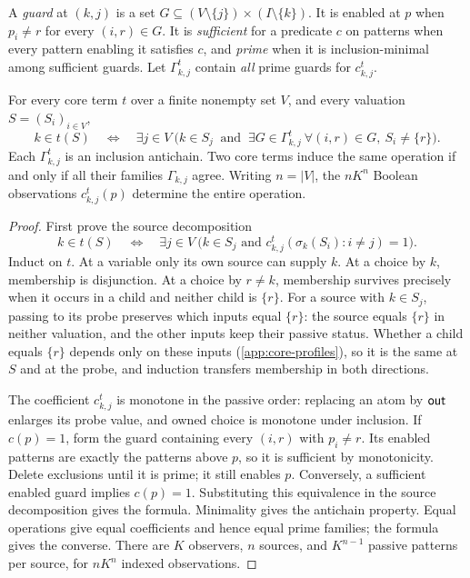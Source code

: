 A \emph{guard} at $(k,j)$ is a set
$G\subseteq(V\setminus\{j\})\times(I\setminus\{k\})$.
It is enabled at $p$ when $p_i\ne r$ for every $(i,r)\in G$.
It is \emph{sufficient} for a predicate $c$ on patterns when every
pattern enabling it satisfies $c$, and \emph{prime} when it is
inclusion-minimal among sufficient guards.
Let $\Gamma^t_{k,j}$ contain \emph{all} prime guards for $c^t_{k,j}$.

\begin{theorem}\label{core:thm:source-guards}
For every core term $t$ over a finite nonempty set $V$, and every valuation
$S=(S_i)_{i\in V}$,
\[
 k\in t(S)\quad\Longleftrightarrow\quad
 \exists j\in V\ \bigl(k\in S_j\ \text{ and }\
 \exists G\in\Gamma^t_{k,j}\ \forall(i,r)\in G,\ S_i\ne\{r\}\bigr).
\]
Each $\Gamma^t_{k,j}$ is an inclusion antichain. Two core terms induce
the same operation if and only if all their families $\Gamma_{k,j}$
agree. Writing $n=|V|$, the $nK^n$ Boolean observations
$c^t_{k,j}(p)$ determine the entire operation.
\end{theorem}
\begin{proof}
First prove the source decomposition
\[
 k\in t(S)\quad\Longleftrightarrow\quad
 \exists j\in V\ \bigl(k\in S_j\text{ and }
 c^t_{k,j}(\sigma_k(S_i):i\ne j)=1\bigr).
\]
Induct on $t$. At a variable only its own source can supply $k$. At a
choice by $k$, membership is disjunction. At a choice by $r\ne k$,
membership survives precisely when it occurs in a child and neither
child is $\{r\}$. For a source with $k\in S_j$, passing to its probe
preserves which inputs equal $\{r\}$: the source equals $\{r\}$ in
neither valuation, and the other inputs keep their passive status.
Whether a child equals $\{r\}$ depends only on these inputs
(\cref{app:core-profiles}), so it is the same at $S$ and at the probe,
and induction transfers membership in both directions.

The coefficient $c^t_{k,j}$ is monotone in the passive order: replacing
an atom by $\mathsf{out}$ enlarges its probe value, and owned choice is monotone
under inclusion. If $c(p)=1$, form the guard containing every $(i,r)$
with $p_i\ne r$. Its enabled patterns are exactly the patterns above
$p$, so it is sufficient by monotonicity. Delete exclusions until it is
prime; it still enables $p$. Conversely, a sufficient enabled guard
implies $c(p)=1$. Substituting this equivalence in the source decomposition
gives the formula. Minimality gives the antichain property. Equal
operations give equal coefficients and hence equal prime families; the
formula gives the converse. There are $K$ observers, $n$ sources, and
$K^{n-1}$ passive patterns per source, for $nK^n$ indexed observations.
\end{proof}

